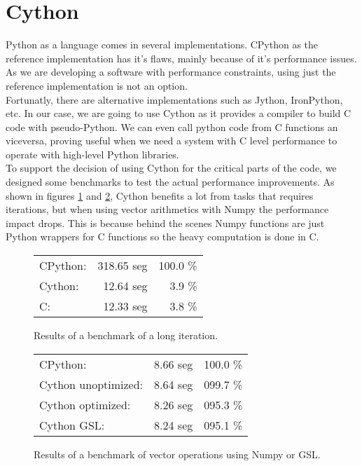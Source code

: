 \section{Cython}

Python as a language comes in several implementations. CPython as the reference
implementation has it's flaws, mainly because of it's performance issues. As we
are developing a software with performance constraints, using just the reference
implementation is not an option.\\

Fortunatly, there are alternative implementations such as Jython, IronPython,
etc. In our case, we are going to use Cython\cite{Cython} as it provides a
compiler to build C code with pseudo-Python. We can even call python code from
C functions an viceversa, proving useful when we need a system with C level
performance to operate with high-level Python libraries.\\

To support the decision of using Cython for the critical parts of the code,
we designed some benchmarks to test the actual performance improvements. As
shown in figures \ref{Cython:fig:1} and \ref{Cython:fig:2}, Cython benefits
a lot from tasks that requires iterations, but when using vector arithmetics
with Numpy the performance impact drops. This is because behind the scenes
Numpy functions are just Python wrappers for C functions so the heavy
computation is done in C.\\

\begin{figure}[ht!]
  \begin{center}
    \begin{tabular}{l r r}
      CPython:  & 318.65 seg & 100.0 \% \\
      Cython:   & 12.64 seg  & 3.9 \%   \\
      C:        & 12.33 seg  & 3.8 \%   \\
    \end{tabular}
  \end{center}
  \caption{Results of a benchmark of a long iteration.}
  \label{Cython:fig:1}
\end{figure}

\begin{figure}[ht!]
  \begin{center}
    \begin{tabular}{l r r}
      CPython:            & 8.66 seg & 100.0 \% \\
      Cython unoptimized: & 8.64 seg & 099.7 \% \\
      Cython optimized:   & 8.26 seg & 095.3 \% \\
      Cython GSL:         & 8.24 seg & 095.1 \%
    \end{tabular}
  \end{center}
  \caption{Results of a benchmark of vector operations using Numpy or GSL.}
  \label{Cython:fig:2}
\end{figure}


